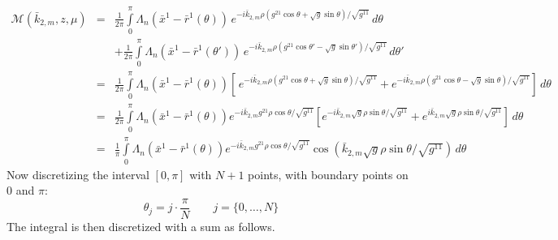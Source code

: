 \begin{eqnarray*}
  \mathcal{M}(\bar{k}_{2,m},z,\mu) 
  &=&\frac{1}{2\pi}\int\limits_0^{\pi} 
  \Lambda_n(\bar x^1-\bar{r}^1(\theta))\,e^{
    -i\bar k_{2,m}\rho \left(
      g^{21} \cos\theta
      +\sqrt{g} \sin\theta
    \right)/\sqrt{g^{11}}
  }\,d\theta\\
  &&+\frac{1}{2\pi}\int\limits_0^\pi
  \Lambda_n(\bar x^1-\bar{r}^1(\theta'))\,e^{
    -i\bar k_{2,m}\rho \left(
      g^{21} \cos\theta'
      -\sqrt{g} \sin\theta'
    \right)/\sqrt{g^{11}}
  }\,d\theta'\\
  &=&\frac{1}{2\pi}\int\limits_0^{\pi} 
  \Lambda_n(\bar x^1-\bar{r}^1(\theta))\left[
    \,e^{
      -i\bar k_{2,m}\rho \left(
        g^{21} \cos\theta
        +\sqrt{g} \sin\theta
      \right)/\sqrt{g^{11}}
    }
    +e^{
      -i\bar k_{2,m}\rho \left(
        g^{21} \cos\theta
        -\sqrt{g} \sin\theta
      \right)/\sqrt{g^{11}}
    }
  \right]\,d\theta\\
  &=&\frac{1}{2\pi}\int\limits_0^{\pi} 
  \Lambda_n(\bar x^1-\bar{r}^1(\theta))e^{
      -i\bar k_{2,m}g^{21} \rho\cos\theta/\sqrt{g^{11}}
    }\left[
    e^{
      -i\bar k_{2,m}\sqrt{g} \rho\sin\theta/\sqrt{g^{11}}
    }
    +e^{
      i\bar k_{2,m} \sqrt{g} \rho\sin\theta/\sqrt{g^{11}}
    }
  \right]\,d\theta\\
  &=&\frac{1}{\pi}\int\limits_0^{\pi} 
  \Lambda_n(\bar x^1-\bar{r}^1(\theta))e^{
      -i\bar k_{2,m}g^{21} \rho\cos\theta/\sqrt{g^{11}}
    }\cos\left(
      \bar k_{2,m}\sqrt{g} \rho\sin\theta/\sqrt{g^{11}}
    \right)\,d\theta
\end{eqnarray*}
Now discretizing the interval $[0,\pi]$ with $N+1$ points, with
boundary points on $0$ and $\pi$:
\begin{displaymath}
  \theta_j=j\cdot\frac{\pi}{N}\qquad j=\{0,\ldots,N\}
\end{displaymath}
The integral is then discretized with a sum as follows.
